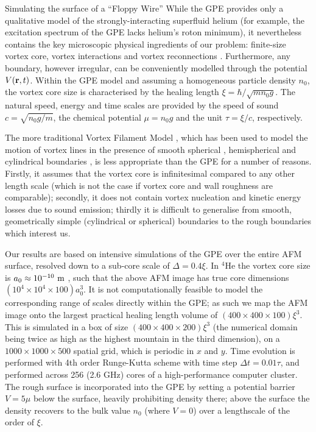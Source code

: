 \begin{chapter}{\label{cha:afm}Simulating the surface of a ``Floppy Wire''}
While the GPE provides only a qualitative model of the strongly-interacting superfluid helium (for example, the excitation spectrum of the GPE lacks helium's roton minimum), it nevertheless contains the key microscopic physical ingredients of our problem: finite-size vortex core, vortex interactions and vortex reconnections \cite{RobertsBerloff-GPE}.  Furthermore, any boundary, however irregular, can be conveniently
modelled through the potential $V({\bf r},t)$.  Within the GPE model and assuming a homogeneous particle density $n_0$, the vortex core size is characterised by the healing length $\xi=\hbar/\sqrt{m n_0 g}$.  The natural speed, energy and time scales are provided by the speed of sound $c=\sqrt{n_0 g/m}$, the chemical potential $\mu=n_0 g$ and the unit $\tau=\xi/c$, respectively.  

The more traditional Vortex Filament Model \cite{Schwarz1988},
which has been used to model the motion of vortex lines in the presence of
smooth spherical \cite{Hanninen-sphere,Kivotides-sphere},
hemispherical \cite{Schwarz-1981-pinning,Tsubota-1994-pinning} 
and cylindrical boundaries \cite{Hanninen-PNAS,Goto2008}, 
is less appropriate than the GPE for a number of reasons.
Firstly, it assumes that the vortex core is infinitesimal compared to 
any other length scale (which is not the case if
vortex core and wall roughness are comparable);
secondly, it does not contain vortex nucleation and kinetic energy losses due
to sound emission; thirdly it is difficult to 
generalise from smooth, geometrically simple (cylindrical or spherical)
boundaries to the rough boundaries which interest us.

Our results are based on intensive simulations of the GPE over the entire AFM surface, resolved down to a sub-core scale of $\Delta=0.4\xi$.  In $^4$He the vortex core size is $a_0 \approx 10^{-10}~\rm m$ \cite{Rayfield1964}, such that the above AFM image has true core dimensions $(10^4 \times 10^4 \times 100) a_0^3$.  It is not computationally feasible to model the corresponding range of scales directly within the GPE; as such we map the AFM image onto the largest practical healing length volume of $(400 \times 400 \times 100) \xi^3$.  This is simulated in a box of size $(400 \times 400 \times 200) \xi^3$ (the numerical domain being twice as high as the highest mountain in the third dimension), on a $1000\times 1000\times 500$ spatial grid, which is periodic in $x$ and $y$.  Time evolution is performed with 4th order Runge-Kutta scheme
with time step $\Delta t=0.01 \tau $, and performed across 256 (2.6 GHz) cores of a high-performance {computer} cluster.  The rough surface is incorporated into the GPE by setting a potential barrier $V=5\mu$ below the surface, heavily prohibiting density there; above the surface the density recovers to the bulk value $n_0$ (where $V=0$) over a lengthscale of the order of $\xi$. 


\end{chapter}
